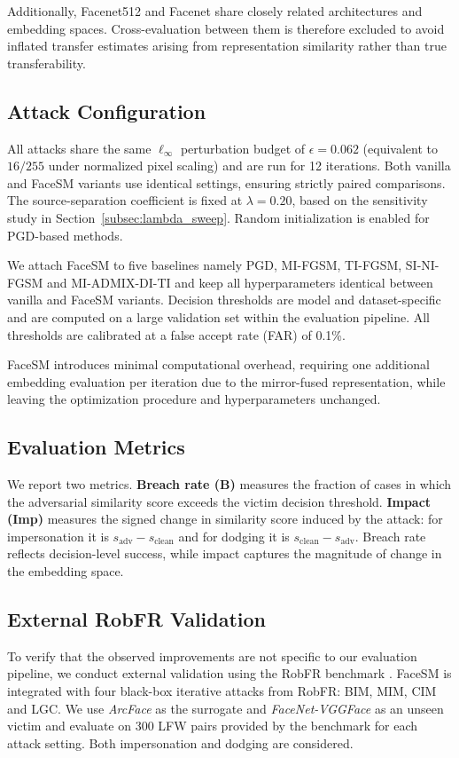\documentclass[a4paper,fleqn]{cas-dc}
\begin{document}
Additionally, Facenet512 and Facenet share closely related architectures and embedding spaces. Cross-evaluation between them is therefore excluded to avoid inflated transfer estimates arising from representation similarity rather than true transferability.

\subsection{Attack Configuration}
All attacks share the same $\ell_\infty$ perturbation budget of $\epsilon = 0.062$ (equivalent to $16/255$ under normalized pixel scaling) and are run for 12 iterations. Both vanilla and FaceSM variants use identical settings, ensuring strictly paired comparisons. The source-separation coefficient is fixed at $\lambda = 0.20$, based on the sensitivity study in Section~\ref{subsec:lambda_sweep}. Random initialization is enabled for PGD-based methods.

We attach FaceSM to five baselines namely PGD, MI-FGSM, TI-FGSM, SI-NI-FGSM and MI-ADMIX-DI-TI and keep all hyperparameters identical between vanilla and FaceSM variants. Decision thresholds are model and dataset-specific and are computed on a large validation set within the evaluation pipeline. All thresholds are calibrated at a false accept rate (FAR) of 0.1\%.

FaceSM introduces minimal computational overhead, requiring one additional embedding evaluation per iteration due to the mirror-fused representation, while leaving the optimization procedure and hyperparameters unchanged.

\subsection{Evaluation Metrics}
We report two metrics. \textbf{Breach rate (B)} measures the fraction of cases in which the adversarial similarity score exceeds the victim decision threshold. \textbf{Impact (Imp)} measures the signed change in similarity score induced by the attack: for impersonation it is $s_{\mathrm{adv}} - s_{\mathrm{clean}}$ and for dodging it is $s_{\mathrm{clean}} - s_{\mathrm{adv}}$. Breach rate reflects decision-level success, while impact captures the magnitude of change in the embedding space. 

\subsection{External RobFR Validation}
To verify that the observed improvements are not specific to our evaluation pipeline, we conduct external validation using the RobFR benchmark \citet{yang2020robfr}. FaceSM is integrated with four black-box iterative attacks from RobFR: BIM, MIM, CIM and LGC. We use \textit{ArcFace} as the surrogate and \textit{FaceNet-VGGFace} as an unseen victim and evaluate on 300 LFW pairs provided by the benchmark for each attack setting. Both impersonation and dodging are considered.
\end{document}
